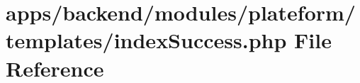 \hypertarget{backend_2modules_2plateform_2templates_2index_success_8php}{\section{apps/backend/modules/plateform/templates/index\-Success.php File Reference}
\label{backend_2modules_2plateform_2templates_2index_success_8php}
}
